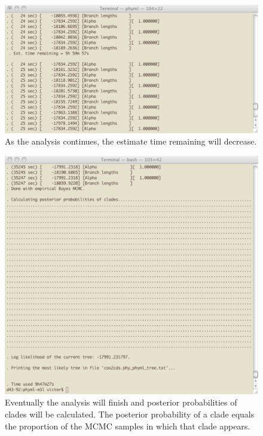 \documentclass[11pt]{article}
\begin{document}
\begin{figure}[p]
\centering
\includegraphics[width=5.5 in]{GRAPHICS/b6.pdf}
\caption{As the analysis continues, the estimate time remaining will decrease.}
\end{figure}
\clearpage

\begin{figure}[p]
\centering
\includegraphics[width=5.5 in]{GRAPHICS/b7.pdf}
\caption{Eventually the analysis will finish and posterior probabilities of clades will be calculated.  The posterior probability of a clade equals the proportion of the MCMC samples in which that clade appears.}
\end{figure}
\clearpage
\end{document}

